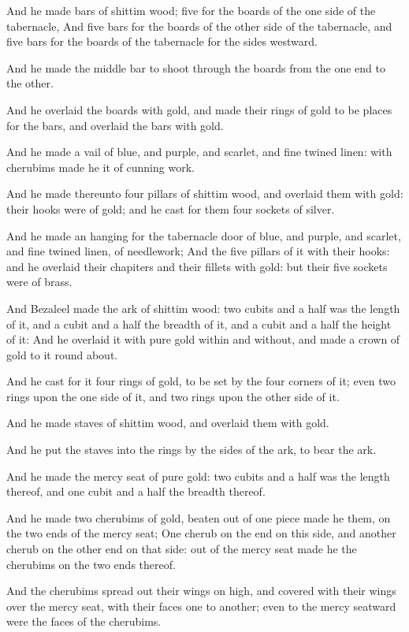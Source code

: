 \Verse And he made bars of shittim wood; five for the boards of the one side of the tabernacle, \Verse And five bars for the boards of the other side of the tabernacle, and five bars for the boards of the tabernacle for the sides westward.

\Verse And he made the middle bar to shoot through the boards from the one end to the other.

\Verse And he overlaid the boards with gold, and made their rings of gold to be places for the bars, and overlaid the bars with gold.

\Verse And he made a vail of blue, and purple, and scarlet, and fine twined linen: with cherubims made he it of cunning work.

\Verse And he made thereunto four pillars of shittim wood, and overlaid them with gold: their hooks were of gold; and he cast for them four sockets of silver.

\Verse And he made an hanging for the tabernacle door of blue, and purple, and scarlet, and fine twined linen, of needlework; \Verse And the five pillars of it with their hooks: and he overlaid their chapiters and their fillets with gold: but their five sockets were of brass.

\Chapter
\Verse And Bezaleel made the ark of shittim wood: two cubits and a half was the length of it, and a cubit and a half the breadth of it, and a cubit and a half the height of it: \Verse And he overlaid it with pure gold within and without, and made a crown of gold to it round about.

\Verse And he cast for it four rings of gold, to be set by the four corners of it; even two rings upon the one side of it, and two rings upon the other side of it.

\Verse And he made staves of shittim wood, and overlaid them with gold.

\Verse And he put the staves into the rings by the sides of the ark, to bear the ark.

\Verse And he made the mercy seat of pure gold: two cubits and a half was the length thereof, and one cubit and a half the breadth thereof.

\Verse And he made two cherubims of gold, beaten out of one piece made he them, on the two ends of the mercy seat; \Verse One cherub on the end on this side, and another cherub on the other end on that side: out of the mercy seat made he the cherubims on the two ends thereof.

\Verse And the cherubims spread out their wings on high, and covered with their wings over the mercy seat, with their faces one to another; even to the mercy seatward were the faces of the cherubims.

